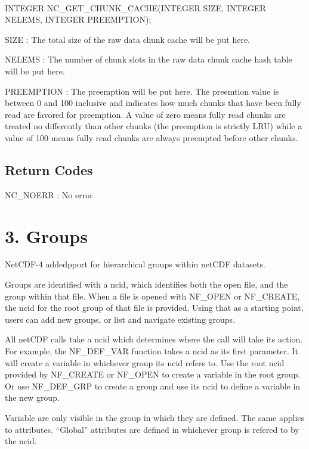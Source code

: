  

I\+N\+T\+E\+G\+ER N\+C\+\_\+\+G\+E\+T\+\_\+\+C\+H\+U\+N\+K\+\_\+\+C\+A\+C\+H\+E(\+I\+N\+T\+E\+G\+E\+R S\+I\+Z\+E, I\+N\+T\+E\+G\+E\+R N\+E\+L\+E\+M\+S, I\+N\+T\+E\+G\+E\+R P\+R\+E\+E\+M\+P\+T\+I\+O\+N);

{\ttfamily S\+I\+ZE} \+: The total size of the raw data chunk cache will be put here.

{\ttfamily N\+E\+L\+E\+MS} \+: The number of chunk slots in the raw data chunk cache hash table will be put here.

{\ttfamily P\+R\+E\+E\+M\+P\+T\+I\+ON} \+: The preemption will be put here. The preemtion value is between 0 and 100 inclusive and indicates how much chunks that have been fully read are favored for preemption. A value of zero means fully read chunks are treated no differently than other chunks (the preemption is strictly L\+RU) while a value of 100 means fully read chunks are always preempted before other chunks.

\subsection*{Return Codes }

{\ttfamily N\+C\+\_\+\+N\+O\+E\+RR} \+: No error.\hypertarget{nc_f77_interface_guide_f77_Groups}{}\section{3. Groups }\label{nc_f77_interface_guide_f77_Groups}
Net\+C\+D\+F-\/4 addedpport for hierarchical groups within net\+C\+DF datasets.

Groups are identified with a ncid, which identifies both the open file, and the group within that file. When a file is opened with N\+F\+\_\+\+O\+P\+EN or N\+F\+\_\+\+C\+R\+E\+A\+TE, the ncid for the root group of that file is provided. Using that as a starting point, users can add new groups, or list and navigate existing groups.

All net\+C\+DF calls take a ncid which determines where the call will take its action. For example, the N\+F\+\_\+\+D\+E\+F\+\_\+\+V\+AR function takes a ncid as its first parameter. It will create a variable in whichever group its ncid refers to. Use the root ncid provided by N\+F\+\_\+\+C\+R\+E\+A\+TE or N\+F\+\_\+\+O\+P\+EN to create a variable in the root group. Or use N\+F\+\_\+\+D\+E\+F\+\_\+\+G\+RP to create a group and use its ncid to define a variable in the new group.

Variable are only visible in the group in which they are defined. The same applies to attributes. “\+Global” attributes are defined in whichever group is refered to by the ncid.

